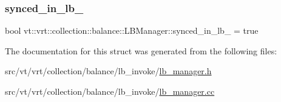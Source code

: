 \subsubsection{\texorpdfstring{synced\+\_\+in\+\_\+lb\+\_\+}{synced\_in\_lb\_}}
{\footnotesize\ttfamily bool vt\+::vrt\+::collection\+::balance\+::\+L\+B\+Manager\+::synced\+\_\+in\+\_\+lb\+\_\+ = true\hspace{0.3cm}{\ttfamily [private]}}



The documentation for this struct was generated from the following files\+:\begin{DoxyCompactItemize}
\item 
src/vt/vrt/collection/balance/lb\+\_\+invoke/\hyperlink{lb__manager_8h}{lb\+\_\+manager.\+h}\item 
src/vt/vrt/collection/balance/lb\+\_\+invoke/\hyperlink{lb__manager_8cc}{lb\+\_\+manager.\+cc}\end{DoxyCompactItemize}

